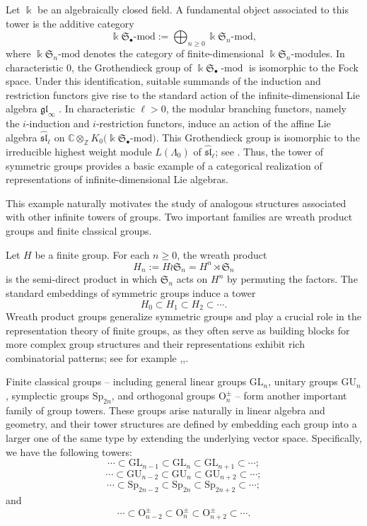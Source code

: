 \documentclass[12pt]{amsart}
\numberwithin{itemcounter}{subsection}
\theoremstyle{plain}
\theoremstyle{definition}
\theoremstyle{remark}
\numberwithin{equation}{section}
\def\k{\Bbbk}
\def\O{\mathrm{O}}
\def\Sp{\mathrm{Sp}}
\def\GL{\mathrm{GL}}
\def\GU{\mathrm{GU}}
\def\mod{\operatorname{-mod}\nolimits}
\begin{document}
Let $\k$ be an algebraically closed field. A fundamental object associated to this tower is the additive category
\[
    \k \mathfrak S_\bullet\text{-mod}
    :=
    \bigoplus_{n \geq 0} \k \mathfrak S_n\text{-mod},
\]
where $\k \mathfrak S_n\text{-mod}$ denotes the category of
finite-dimensional $\k\mathfrak S_n$-modules. In characteristic $0$, the Grothendieck group of $\k \mathfrak S_\bullet\mod$ is isomorphic to the Fock space. Under this
identification, suitable summands of the induction and restriction functors
give rise to the standard action of the infinite-dimensional Lie algebra
$\mathfrak{gl}_\infty$ \cite{OV96}. 
In characteristic $\ell>0$, the modular branching functors, namely the
$i$-induction and $i$-restriction functors, induce an action of the affine Lie
algebra $\widehat{\mathfrak{sl}}_\ell$ on
\(
    \mathbb C\otimes_{\mathbb Z}
    K_0\bigl(\k\mathfrak S_\bullet\text{-mod}\bigr).
\)
This Grothendieck group is isomorphic to the irreducible highest weight module
$L(\Lambda_0)$ of $\widehat{\mathfrak{sl}}_\ell$; see \cite{LLT}.
Thus, the tower of symmetric groups provides a basic
example of a categorical realization of representations of 
infinite-dimensional Lie algebras.

This example naturally motivates the study of analogous structures associated
with other infinite towers of groups. Two important families are wreath
product groups and finite classical groups. 

Let $H$ be a finite group. For each $n\geq 0$, the wreath product
\[
H_n:=H\wr\mathfrak S_n=H^n\rtimes\mathfrak S_n
\]
is the semi-direct product in which $\mathfrak S_n$ acts on $H^n$ by permuting
the factors. The standard embeddings of symmetric groups induce a tower
\[
H_0\subset H_1\subset H_2\subset\cdots.
\]
Wreath product groups generalize symmetric groups and play a crucial role in the representation theory of finite groups, as they often serve as building blocks for more complex group structures and their representations exhibit rich combinatorial patterns; see for example \cite[Ch.~4]{JK81},\cite[Appendix~B]{Mac95},\cite{Pus99}.

Finite classical groups -- including general linear groups $\GL_n$, unitary groups $\GU_n$, symplectic groups $\Sp_{2n}$, and orthogonal groups $\O^\pm_n$ -- form another important family of group towers. These groups arise naturally in linear algebra and geometry, and their tower structures are defined by embedding each group into a larger one of the same type by extending the underlying vector space. Specifically, we have the following towers:
\[
\cdots \subset\GL_{n-1}\subset \GL_n\subset \GL_{n+1}\subset \cdots ;
\]
\[
\cdots \subset \GU_{n-2}\subset \GU_{n}\subset \GU_{n+2}\subset \cdots ;
\]
\[
\cdots \subset \Sp_{2n-2}\subset \Sp_{2n}\subset \Sp_{2n+2}\subset \cdots ;
\]
and
\[
\cdots \subset \O^\pm_{n-2}\subset \O^\pm_{n}\subset \O^\pm_{n+2}\subset \cdots .
\]
\end{document}
